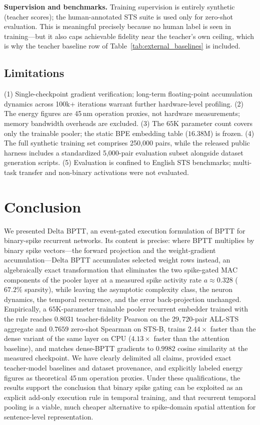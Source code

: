 \documentclass[10pt,journal,compsoc]{IEEEtran}
\begin{document}
\textbf{Supervision and benchmarks.} Training supervision is entirely synthetic (teacher scores); the human-annotated STS suite is used only for zero-shot evaluation. This is meaningful precisely because no human label is seen in training---but it also caps achievable fidelity near the teacher's own ceiling, which is why the teacher baseline row of Table~\ref{tab:external_baselines} is included.

\subsection{Limitations}
(1) Single-checkpoint gradient verification; long-term floating-point accumulation dynamics across 100k+ iterations warrant further hardware-level profiling. (2) The energy figures are 45\,nm operation proxies, not hardware measurements; memory bandwidth overheads are excluded. (3) The $65$K parameter count covers only the trainable pooler; the static BPE embedding table ($16.38$M) is frozen. (4) The full synthetic training set comprises 250,000 pairs, while the released public harness includes a standardized 5,000-pair evaluation subset alongside dataset generation scripts. (5) Evaluation is confined to English STS benchmarks; multi-task transfer and non-binary activations were not evaluated.

\section{Conclusion}
We presented Delta BPTT, an event-gated execution formulation of BPTT for binary-spike recurrent networks. Its content is precise: where BPTT multiplies by binary spike vectors---the forward projection and the weight-gradient accumulation---Delta BPTT accumulates selected weight rows instead, an algebraically exact transformation that eliminates the two spike-gated MAC components of the pooler layer at a measured spike activity rate $a \approx 0.328$ ($67.2\%$ sparsity), while leaving the asymptotic complexity class, the neuron dynamics, the temporal recurrence, and the error back-projection unchanged. Empirically, a $65$K-parameter trainable pooler recurrent embedder trained with the rule reaches $0.8031$ teacher-fidelity Pearson on the $29{,}720$-pair ALL-STS aggregate and $0.7659$ zero-shot Spearman on STS-B, trains $2.44\times$ faster than the dense variant of the same layer on CPU ($4.13\times$ faster than the attention baseline), and matches dense-BPTT gradients to $0.9982$ cosine similarity at the measured checkpoint. We have clearly delimited all claims, provided exact teacher-model baselines and dataset provenance, and explicitly labeled energy figures as theoretical 45\,nm operation proxies. Under these qualifications, the results support the conclusion that binary spike gating can be exploited as an explicit add-only execution rule in temporal training, and that recurrent temporal pooling is a viable, much cheaper alternative to spike-domain spatial attention for sentence-level representation.
\end{document}
